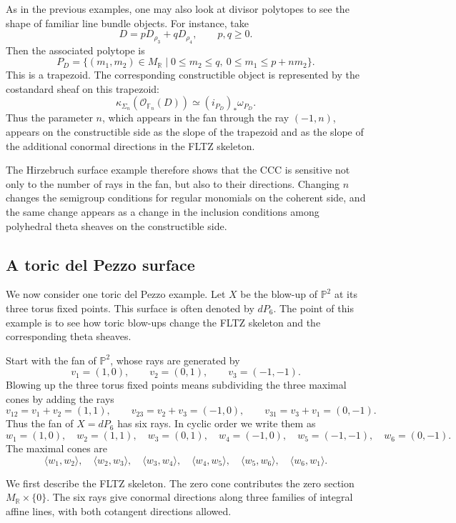 As in the previous examples, one may also look at divisor polytopes to see the
shape of familiar line bundle objects. For instance, take
\[
D=pD_{\rho_3}+qD_{\rho_4},\qquad p,q\ge 0.
\]
Then the associated polytope is
\[
P_D
=
\{(m_1,m_2)\in M_{\mathbb R}\mid
0\le m_2\le q,\ 0\le m_1\le p+nm_2\}.
\]
This is a trapezoid. The corresponding constructible object is represented by
the costandard sheaf on this trapezoid:
\[
\kappa_{\Sigma_n}(\mathcal O_{\mathbb F_n}(D))
\simeq
(i_{P_D})_*\omega_{P_D}.
\]
Thus the parameter \(n\), which appears in the fan through the ray
\((-1,n)\), appears on the constructible side as the slope of the trapezoid and
as the slope of the additional conormal directions in the FLTZ skeleton.

The Hirzebruch surface example therefore shows that the CCC is sensitive not
only to the number of rays in the fan, but also to their directions. Changing
\(n\) changes the semigroup conditions for regular monomials on the coherent
side, and the same change appears as a change in the inclusion conditions among
polyhedral theta sheaves on the constructible side.


\subsection{A toric del Pezzo surface}

We now consider one toric del Pezzo example. Let \(X\) be the blow-up of
\(\mathbb P^2\) at its three torus fixed points. This surface is often denoted
by \(dP_6\). The point of this example is to see how toric blow-ups change the
FLTZ skeleton and the corresponding theta sheaves.

Start with the fan of \(\mathbb P^2\), whose rays are generated by
\[
v_1=(1,0),\qquad v_2=(0,1),\qquad v_3=(-1,-1).
\]
Blowing up the three torus fixed points means subdividing the three maximal
cones by adding the rays
\[
v_{12}=v_1+v_2=(1,1),\qquad
v_{23}=v_2+v_3=(-1,0),\qquad
v_{31}=v_3+v_1=(0,-1).
\]
Thus the fan of \(X=dP_6\) has six rays. In cyclic order we write them as
\[
w_1=(1,0),\quad
w_2=(1,1),\quad
w_3=(0,1),\quad
w_4=(-1,0),\quad
w_5=(-1,-1),\quad
w_6=(0,-1).
\]
The maximal cones are
\[
\langle w_1,w_2\rangle,\quad
\langle w_2,w_3\rangle,\quad
\langle w_3,w_4\rangle,\quad
\langle w_4,w_5\rangle,\quad
\langle w_5,w_6\rangle,\quad
\langle w_6,w_1\rangle.
\]

We first describe the FLTZ skeleton. The zero cone contributes the zero section
\(M_{\mathbb R}\times\{0\}\). The six rays give conormal directions along three
families of integral affine lines, with both cotangent directions allowed.

